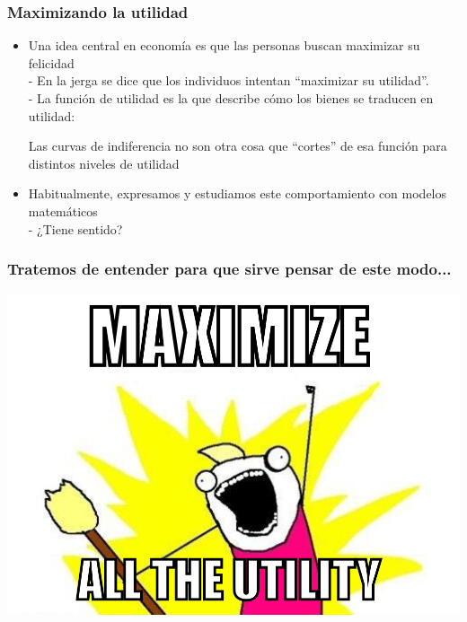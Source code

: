 \documentclass{beamer}
\begin{document}
\begin{frame}
\frametitle{Maximizando la utilidad}
\begin{itemize}
    \item Una idea central en economía es que las personas buscan maximizar su felicidad
    \\ \vspace{2mm}
    - En la jerga se dice que los individuos intentan ``maximizar su utilidad''. \\ \vspace{2mm}
    - La función de utilidad es la que describe cómo los bienes se traducen en utilidad: \vspace{2mm}
        \begin{itemize}
        Las curvas de indiferencia no son otra cosa que ``cortes'' de esa función para distintos niveles de utilidad
        \end{itemize}
    \item Habitualmente, expresamos y estudiamos este comportamiento con modelos matemáticos \\
    - ¿Tiene sentido?
\end{itemize} 
\end{frame}

\begin{frame}
\frametitle{ Tratemos de entender para que sirve pensar de este modo...}
\centering
\includegraphics[scale=0.5]{Figures/Tema_02.23_rp21.png}
\end{frame}
\end{document}
